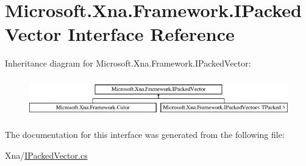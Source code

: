 \hypertarget{interface_microsoft_1_1_xna_1_1_framework_1_1_i_packed_vector}{}\section{Microsoft.\+Xna.\+Framework.\+I\+Packed\+Vector Interface Reference}
\label{interface_microsoft_1_1_xna_1_1_framework_1_1_i_packed_vector}
Inheritance diagram for Microsoft.\+Xna.\+Framework.\+I\+Packed\+Vector\+:\begin{figure}[H]
\begin{center}
\leavevmode
\includegraphics[height=1.712538cm]{interface_microsoft_1_1_xna_1_1_framework_1_1_i_packed_vector}
\end{center}
\end{figure}


The documentation for this interface was generated from the following file\+:\begin{DoxyCompactItemize}
\item 
Xna/\hyperlink{_i_packed_vector_8cs}{I\+Packed\+Vector.\+cs}\end{DoxyCompactItemize}
